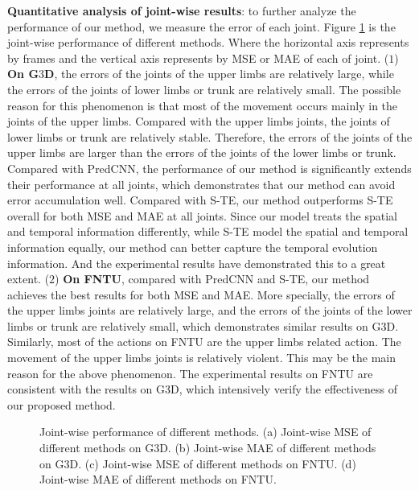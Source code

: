 \documentclass[journal]{IEEEtran}
\begin{document}
{\bf Quantitative analysis of joint-wise results}: to further analyze the performance of our method, we measure the error of each joint. Figure \ref{fig7} is the joint-wise performance of different methods. Where the horizontal axis represents by frames and the vertical axis represents by MSE or MAE of each of joint. (${1}$) {\bf On G${3}$D}, the errors of the joints of the upper limbs are relatively large, while the errors of the joints of lower limbs or trunk are relatively small. The possible reason for this phenomenon is that most of the movement occurs mainly in the joints of the upper limbs. Compared with the upper limbs joints, the joints of lower limbs or trunk are relatively stable. Therefore, the errors of the joints of the upper limbs are larger than the errors of the joints of the lower limbs or trunk. Compared with PredCNN, the performance of our method is significantly extends their performance at all joints, which demonstrates that our method can avoid error accumulation well. Compared with S-TE, our method outperforms S-TE overall for both MSE and MAE at all joints. Since our model treats the spatial and temporal information differently, while S-TE model the spatial and temporal information equally, our method can better capture the temporal evolution information. And the experimental results have demonstrated this to a great extent. (${2}$) {\bf On FNTU}, compared with PredCNN and S-TE, our method achieves the best results for both MSE and MAE. More specially, the errors of the upper limbs joints are relatively large, and the errors of the joints of the lower limbs or trunk are relatively small, which demonstrates similar results on G${3}$D. Similarly, most of the actions on FNTU are the upper limbs related action. The movement of the upper limbs joints is relatively violent. This may be the main reason for the above phenomenon. The experimental results on FNTU are consistent with the results on G${3}$D, which intensively verify the effectiveness of our proposed method.


\begin{figure}[!t]
\centering
{}
\hfil
{}
\hfil
{}
\hfil
{}
\caption{Joint-wise performance of different methods. (a) Joint-wise MSE of different methods on G${3}$D. (b) Joint-wise MAE of different methods on G${3}$D. (c) Joint-wise MSE of different methods on FNTU. (d) Joint-wise MAE of different methods on FNTU. }
\label{fig7}
\end{figure}
\end{document}
